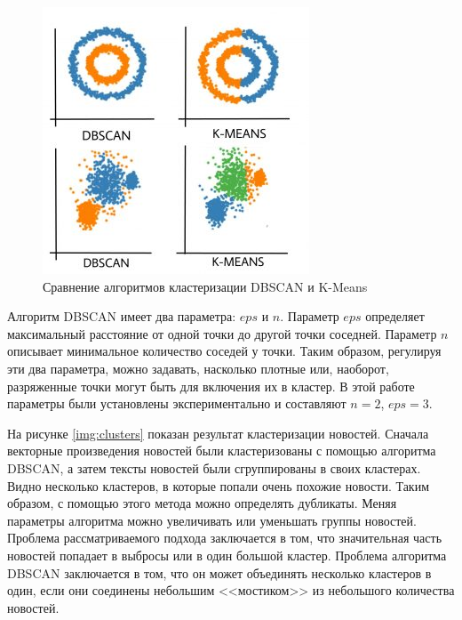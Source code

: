 \begin{figure}[h]
    \centering
    \includegraphics{images/dbscan-vs-kmeans.jpg}
    \caption{Сравнение алгоритмов кластеризации DBSCAN и K-Means}
    \label{img:dbscan-vs-kmeans}
\end{figure}

Алгоритм DBSCAN имеет два параметра: $eps$ и $n$. Параметр $eps$ определяет максимальный расстояние от одной точки до другой точки соседней. Параметр $n$ описывает минимальное количество соседей у точки. Таким образом, регулируя эти два параметра, можно задавать, насколько плотные или, наоборот, разряженные точки могут быть для включения их в кластер. В этой работе параметры были установлены экспериментально и составляют $n = 2$, $eps = 3$.

На рисунке \ref{img:clusters} показан результат кластеризации новостей. Сначала векторные произведения новостей были кластеризованы с помощью алгоритма DBSCAN, а затем тексты новостей были сгруппированы в своих кластерах. Видно несколько кластеров, в которые попали очень похожие новости. Таким образом, с помощью этого метода можно определять дубликаты. Меняя параметры алгоритма можно увеличивать или уменьшать группы новостей. Проблема рассматриваемого подхода заключается в том, что значительная часть новостей попадает в выбросы или в один большой кластер. Проблема алгоритма DBSCAN заключается в том, что он может объединять несколько кластеров в один, если они соединены небольшим <<мостиком>> из небольшого количества новостей.


